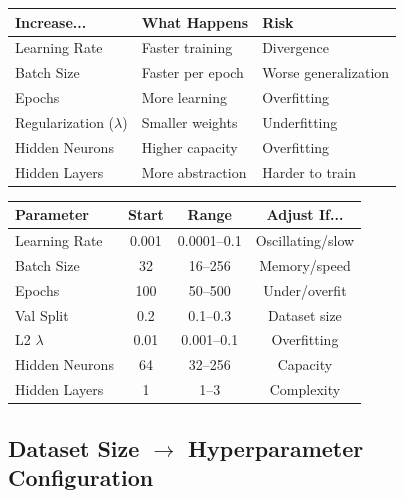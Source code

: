 \documentclass[11pt,a4paper]{article}
\begin{document}
\begin{definitionbox}

\begin{tabular}{@{}l|l|l@{}}
\textbf{Increase...} & \textbf{What Happens} & \textbf{Risk} \\
\hline
Learning Rate & Faster training & Divergence \\
Batch Size & Faster per epoch & Worse generalization \\
Epochs & More learning & Overfitting \\
Regularization ($\lambda$) & Smaller weights & Underfitting \\
Hidden Neurons & Higher capacity & Overfitting \\
Hidden Layers & More abstraction & Harder to train \\
\end{tabular}
\end{definitionbox}

\begin{examplebox}

\begin{tabular}{@{}l|c|c|c@{}}
\textbf{Parameter} & \textbf{Start} & \textbf{Range} & \textbf{Adjust If...} \\
\hline
Learning Rate & 0.001 & 0.0001--0.1 & Oscillating/slow \\
Batch Size & 32 & 16--256 & Memory/speed \\
Epochs & 100 & 50--500 & Under/overfit \\
Val Split & 0.2 & 0.1--0.3 & Dataset size \\
L2 $\lambda$ & 0.01 & 0.001--0.1 & Overfitting \\
Hidden Neurons & 64 & 32--256 & Capacity \\
Hidden Layers & 1 & 1--3 & Complexity \\
\end{tabular}
\end{examplebox}

\subsection*{Dataset Size $\to$ Hyperparameter Configuration}
\end{document}
